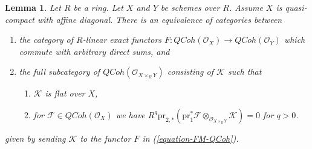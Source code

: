\documentclass[10pt,a4paper]{amsart}
\theoremstyle{plain}
\newtheorem{lemma}[subsection]{Lemma}
\theoremstyle{definition}
\theoremstyle{remark}
\numberwithin{equation}{subsection}
\def\QCoh{\mathit{QCoh}}
\begin{document}
\begin{lemma}
\label{lemma-functor-quasi-coherent-from-affine-diagonal}
Let $R$ be a ring. Let $X$ and $Y$ be schemes over $R$. Assume $X$ is
quasi-compact with affine diagonal.
There is an equivalence of categories between
\begin{enumerate}
\item the category of $R$-linear exact functors
$F : \QCoh(\mathcal{O}_X) \to \QCoh(\mathcal{O}_Y)$
which commute with arbitrary direct sums, and
\item the full subcategory of $\QCoh(\mathcal{O}_{X \times_R Y})$ consisting
of $\mathcal{K}$ such that
\begin{enumerate}
\item $\mathcal{K}$ is flat over $X$,
\item for $\mathcal{F} \in \QCoh(\mathcal{O}_X)$ we have
$R^q\text{pr}_{2, *}(\text{pr}_1^*\mathcal{F}
\otimes_{\mathcal{O}_{X \times_R Y}} \mathcal{K}) = 0$ for $q > 0$.
\end{enumerate}
\end{enumerate}
given by sending $\mathcal{K}$ to the functor $F$ in (\ref{equation-FM-QCoh}).
\end{lemma}
\end{document}
